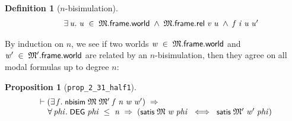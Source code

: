 \documentclass[letterpaper]{article}
\newtheorem{defn}{Definition}
\newtheorem{prop}{Proposition}
\renewcommand{\HOLConst}[1]{{\textsf{\upshape\small #1}}}
\renewcommand{\HOLinline}[1]{\ensuremath{#1}}
\newenvironment{holmath}{\begin{displaymath}\begin{array}{l}}{\end{array}\end{displaymath}\ignorespacesafterend}
\begin{document}
\begin{defn}[$n$-bisimulation]
\begin{holmath}
\;\;\;\;\;\;\HOLSymConst{\HOLTokenExists{}}\HOLBoundVar{u}.\;\HOLBoundVar{u}\;\HOLSymConst{\HOLTokenIn{}}\;\HOLFreeVar{\ensuremath{\mathfrak{M}}}.\HOLFieldName{frame}.\HOLFieldName{world}\;\HOLSymConst{\HOLTokenConj{}}\;\HOLFreeVar{\ensuremath{\mathfrak{M}}}.\HOLFieldName{frame}.\HOLFieldName{rel}\;\HOLBoundVar{v}\;\HOLBoundVar{u}\;\HOLSymConst{\HOLTokenConj{}}\;\HOLFreeVar{f}\;\HOLBoundVar{i}\;\HOLBoundVar{u}\;\HOLBoundVar{u\sp{\prime}}
\end{holmath} 
\end{defn}

By induction on $n$, we see if two worlds \HOLinline{\HOLFreeVar{w}\;\HOLSymConst{\HOLTokenIn{}}\;\HOLFreeVar{\ensuremath{\mathfrak{M}}}.\HOLFieldName{frame}.\HOLFieldName{world}} and \HOLinline{\HOLFreeVar{w\sp{\prime}}\;\HOLSymConst{\HOLTokenIn{}}\;\HOLFreeVar{\ensuremath{\mathfrak{M}'}}.\HOLFieldName{frame}.\HOLFieldName{world}} are related by an $n$-bisimulation, then they agree on all modal formulas up to degree $n$:
\begin{prop}[\texttt{prop_2_31_half1}]
\begin{holmath}
  \ensuremath{\HOLTokenTurnstile}(\HOLSymConst{\HOLTokenExists{}}\HOLBoundVar{f}.\;\HOLConst{nbisim}\;\HOLFreeVar{\ensuremath{\mathfrak{M}}}\;\HOLFreeVar{\ensuremath{\mathfrak{M}'}}\;\HOLBoundVar{f}\;\HOLFreeVar{n}\;\HOLFreeVar{w}\;\HOLFreeVar{w\sp{\prime}})\;\HOLSymConst{\HOLTokenImp{}}\\
\;\;\;\;\;\HOLSymConst{\HOLTokenForall{}}\HOLBoundVar{phi}.\;\HOLConst{DEG}\;\HOLBoundVar{phi}\;\HOLSymConst{\HOLTokenLeq{}}\;\HOLFreeVar{n}\;\HOLSymConst{\HOLTokenImp{}}\;(\HOLConst{satis}\;\HOLFreeVar{\ensuremath{\mathfrak{M}}}\;\HOLFreeVar{w}\;\HOLBoundVar{phi}\;\HOLSymConst{\HOLTokenEquiv{}}\;\HOLConst{satis}\;\HOLFreeVar{\ensuremath{\mathfrak{M}'}}\;\HOLFreeVar{w\sp{\prime}}\;\HOLBoundVar{phi})
\end{holmath}
\end{prop}
\end{document}
